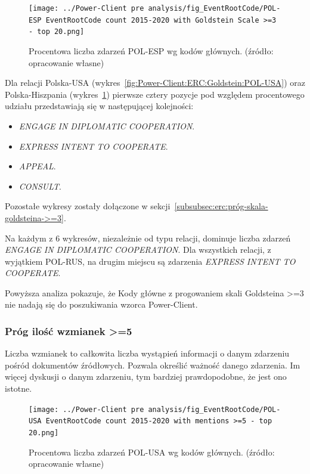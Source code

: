 \documentclass[11pt]{report}
\begin{document}
    \begin{figure}[!htp]
        \centering
        \texttt{[image: ../Power-Client pre analysis/fig\_EventRootCode/POL-ESP EventRootCode count 2015-2020 with Goldstein Scale >=3 - top 20.png]}
        \caption{Procentowa liczba zdarzeń POL-ESP wg kodów głównych. (źródło: opracowanie własne)}
        \label{fig:Power-Client:ERC:Goldstein:POL-ESP}
    \end{figure}

    Dla relacji Polska-USA (wykres~\ref{fig:Power-Client:ERC:Goldstein:POL-USA}) oraz Polska-Hiszpania (wykres~\ref{fig:Power-Client:ERC:Goldstein:POL-ESP})
    pierwsze cztery pozycje pod względem procentowego udziału przedstawiają się w następującej kolejności:
    \begin{itemize}
        \item \textit{ENGAGE IN DIPLOMATIC COOPERATION}.
        \item \textit{EXPRESS INTENT TO COOPERATE}.
        \item \textit{APPEAL}.
        \item \textit{CONSULT}.
    \end{itemize}

    Pozostałe wykresy zostały dołączone w sekcji~\ref{subsubsec:erc:próg-skala-goldsteina->=3}.

    Na każdym z 6 wykresów, niezależnie od typu relacji, dominuje liczba zdarzeń \textit{ENGAGE IN DIPLOMATIC COOPERATION}.
    Dla wszystkich relacji, z wyjątkiem POL-RUS, na drugim miejscu są zdarzenia \textit{EXPRESS INTENT TO COOPERATE}.

    Powyższa analiza pokazuje, że Kody główne z progowaniem skali Goldsteina >=3 nie nadają się do poszukiwania wzorca Power-Client.

    \subsubsection{Próg ilość wzmianek >=5}
    Liczba wzmianek to całkowita liczba wystąpień informacji o danym zdarzeniu pośród dokumentów źródłowych.
    Pozwala określić ważność danego zdarzenia.
    Im więcej dyskusji o danym zdarzeniu, tym bardziej prawdopodobne, że jest ono istotne.

    \begin{figure}[!htp]
        \centering
        \texttt{[image: ../Power-Client pre analysis/fig\_EventRootCode/POL-USA EventRootCode count 2015-2020 with mentions >=5 - top 20.png]}
        \caption{Procentowa liczba zdarzeń POL-USA wg kodów głównych. (źródło: opracowanie własne)}
        \label{fig:Power-Client:ERC:Mentions:POL-USA}
    \end{figure}
\end{document}

